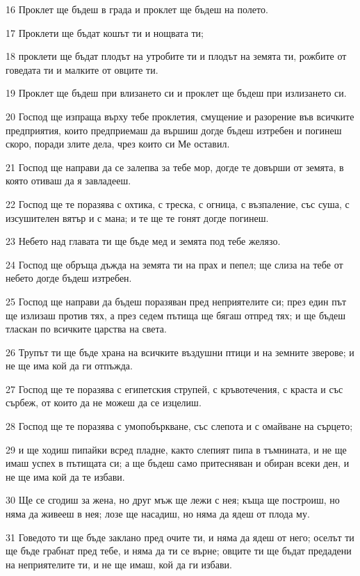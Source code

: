 \par 16 Проклет ще бъдеш в града и проклет ще бъдеш на полето.
\par 17 Проклети ще бъдат кошът ти и нощвата ти;
\par 18 проклети ще бъдат плодът на утробите ти и плодът на земята ти, рожбите от говедата ти и малките от овците ти.
\par 19 Проклет ще бъдеш при влизането си и проклет ще бъдеш при излизането си.
\par 20 Господ ще изпраща върху тебе проклетия, смущение и разорение във всичките предприятия, които предприемаш да вършиш догде бъдеш изтребен и погинеш скоро, поради злите дела, чрез които си Ме оставил.
\par 21 Господ ще направи да се залепва за тебе мор, догде те довърши от земята, в която отиваш да я завладееш.
\par 22 Господ ще те поразява с охтика, с треска, с огница, с възпаление, със суша, с изсушителен вятър и с мана; и те ще те гонят догде погинеш.
\par 23 Небето над главата ти ще бъде мед и земята под тебе желязо.
\par 24 Господ ще обръща дъжда на земята ти на прах и пепел; ще слиза на тебе от небето догде бъдеш изтребен.
\par 25 Господ ще направи да бъдеш поразяван пред неприятелите си; през един път ще излизаш против тях, а през седем пътища ще бягаш отпред тях; и ще бъдеш тласкан по всичките царства на света.
\par 26 Трупът ти ще бъде храна на всичките въздушни птици и на земните зверове; и не ще има кой да ги отпъжда.
\par 27 Господ ще те поразява с египетския струпей, с кръвотечения, с краста и със сърбеж, от които да не можеш да се изцелиш.
\par 28 Господ ще те поразява с умопобъркване, със слепота и с омайване на сърцето;
\par 29 и ще ходиш пипайки всред пладне, както слепият пипа в тъмнината, и не ще имаш успех в пътищата си; а ще бъдеш само притесняван и обиран всеки ден, и не ще има кой да те избави.
\par 30 Ще се сгодиш за жена, но друг мъж ще лежи с нея; къща ще построиш, но няма да живееш в нея; лозе ще насадиш, но няма да ядеш от плода му.
\par 31 Говедото ти ще бъде заклано пред очите ти, и няма да ядеш от него; оселът ти ще бъде грабнат пред тебе, и няма да ти се върне; овците ти ще бъдат предадени на неприятелите ти, и не ще имаш, кой да ги избави.
